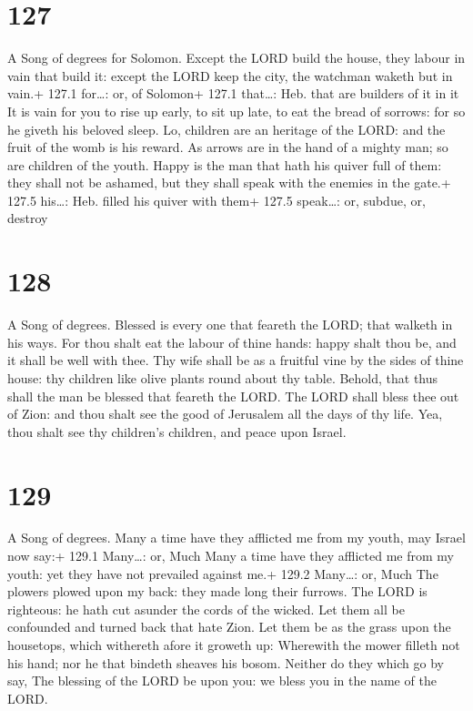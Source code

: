 \hypertarget{section-127}{%
\section{127}\label{section-127}}

A Song of degrees for Solomon.  Except the LORD build the
house, they labour in vain that build it: except the LORD keep the city,
the watchman waketh but in vain.+ 127.1 for\ldots: or, of Solomon+ 127.1
that\ldots: Heb. that are builders of it in it  It is vain
for you to rise up early, to sit up late, to eat the bread of sorrows:
for so he giveth his beloved sleep.  Lo, children are an
heritage of the LORD: and the fruit of the womb is his reward.
 As arrows are in the hand of a mighty man; so are children
of the youth.  Happy is the man that hath his quiver full of
them: they shall not be ashamed, but they shall speak with the enemies
in the gate.+ 127.5 his\ldots: Heb. filled his quiver with them+ 127.5
speak\ldots: or, subdue, or, destroy

\hypertarget{section-128}{%
\section{128}\label{section-128}}

A Song of degrees.  Blessed is every one that feareth the
LORD; that walketh in his ways.  For thou shalt eat the
labour of thine hands: happy shalt thou be, and it shall be well with
thee.  Thy wife shall be as a fruitful vine by the sides of
thine house: thy children like olive plants round about thy table.
 Behold, that thus shall the man be blessed that feareth the
LORD.  The LORD shall bless thee out of Zion: and thou shalt
see the good of Jerusalem all the days of thy life.  Yea,
thou shalt see thy children's children, and peace upon Israel.

\hypertarget{section-129}{%
\section{129}\label{section-129}}

A Song of degrees.  Many a time have they afflicted me from
my youth, may Israel now say:+ 129.1 Many\ldots: or, Much 
Many a time have they afflicted me from my youth: yet they have not
prevailed against me.+ 129.2 Many\ldots: or, Much  The
plowers plowed upon my back: they made long their furrows. 
The LORD is righteous: he hath cut asunder the cords of the wicked.
 Let them all be confounded and turned back that hate Zion.
 Let them be as the grass upon the housetops, which
withereth afore it groweth up:  Wherewith the mower filleth
not his hand; nor he that bindeth sheaves his bosom. 
Neither do they which go by say, The blessing of the LORD be upon you:
we bless you in the name of the LORD.

